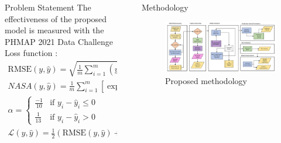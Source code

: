 \documentclass[final, 12pt]{beamer}
\newlength{\sepwidth}
\newlength{\colwidth}
\newlength{\smallcolwidth}
\newlength{\bigcolwidth}
\newcommand{\separatorcolumn}{\begin{column}{\sepwidth}\end{column}}
\begin{document}
\begin{frame}[t]
\begin{columns}[t]
\begin{column}{\smallcolwidth}
\begin{block}{Problem Statement}
        The effectiveness of the proposed model is measured with the PHMAP 2021 Data Challenge Loss function \cite{chao2021phm}:
        \begin{equation} \label{eqn:phmap_loss}
            \begin{gathered}
                \text{RMSE}(y, \hat{y}) = \sqrt{\frac{1}{m}\sum_{i=1}^{m} (y_i - \hat{y}_i)^{2}} \\
                \textit{NASA}(y, \hat{y}) = \frac{1}{m}\sum_{i=1}^{m} \left[\exp (\alpha \cdot (y_i - \hat{y}_i)) - 1\right]\\
                \alpha = \begin{cases}
                    \frac{-1}{10} & \text{if } y_i - \hat{y}_i \leq 0 \\
                    \frac{1}{13} & \text{if } y_i - \hat{y}_i > 0
                \end{cases}  \\
                \mathcal{L}(y, \hat{y}) = \frac{1}{2} \left(\text{RMSE}(y, \hat{y}) + \textit{NASA}(y, \hat{y})\right). \\
            \end{gathered}
        \end{equation}
    \end{block}

\end{column}

\separatorcolumn

\begin{column}{\bigcolwidth}

    \begin{block}{Methodology}

        \begin{figure}
            \centering
            \includegraphics[width=\textwidth]{figures/research_diagram.pdf}
            \caption{Proposed methodology}
        \end{figure}


\end{block}
\end{column}
\end{columns}
\end{frame}
\end{document}
